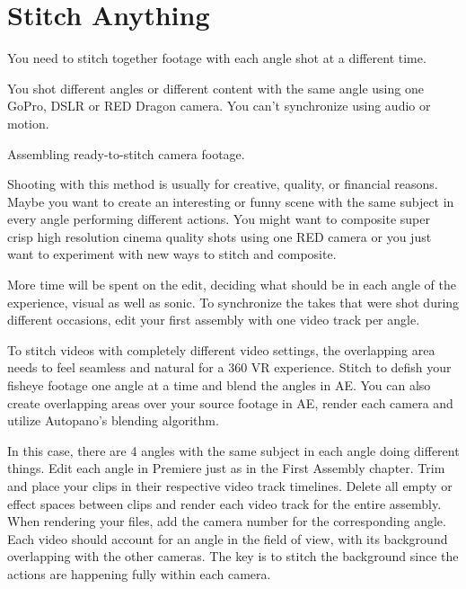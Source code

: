 \chapter{Stitch Anything}
\pagecolor{white}
\label{chap:49}
\begin{fullwidth}

\problem

{\large You need to stitch together footage with each angle shot at a different time. \par}

You shot different angles or different content with the same angle using one GoPro, DSLR or RED Dragon camera. You can’t synchronize using audio or motion. 

\solution

{\large Assembling ready-to-stitch camera footage. \par}

Shooting with this method is usually for creative, quality, or financial reasons. Maybe you want to create an interesting or funny scene with the same subject in every angle performing different actions. You might want to composite super crisp high resolution cinema quality shots using one RED camera or you just want to experiment with new ways to stitch and composite.

More time will be spent on the edit, deciding what should be in each angle of the experience, visual as well as sonic. To synchronize the takes that were shot during different occasions, edit your first assembly with one video track per angle. 


To stitch videos with completely different video settings, the overlapping area needs to feel seamless and natural for a 360 VR experience. Stitch to defish your fisheye footage one angle at a time and blend the angles in AE. You can also create overlapping areas over your source footage in AE, render each camera and utilize Autopano’s blending algorithm.
\clearpage
{}

In this case, there are 4 angles with the same subject in each angle doing different things. Edit each angle in Premiere just as in the First Assembly chapter. Trim and place your clips in their respective video track timelines. Delete all empty or effect spaces between clips and render each video track for the entire assembly. When rendering your files, add the camera number for the corresponding angle. Each video should account for an angle in the field of view, with its background overlapping with the other cameras. The key is to stitch the background since the actions are happening fully within each camera. 


\clearpage
\end{fullwidth}